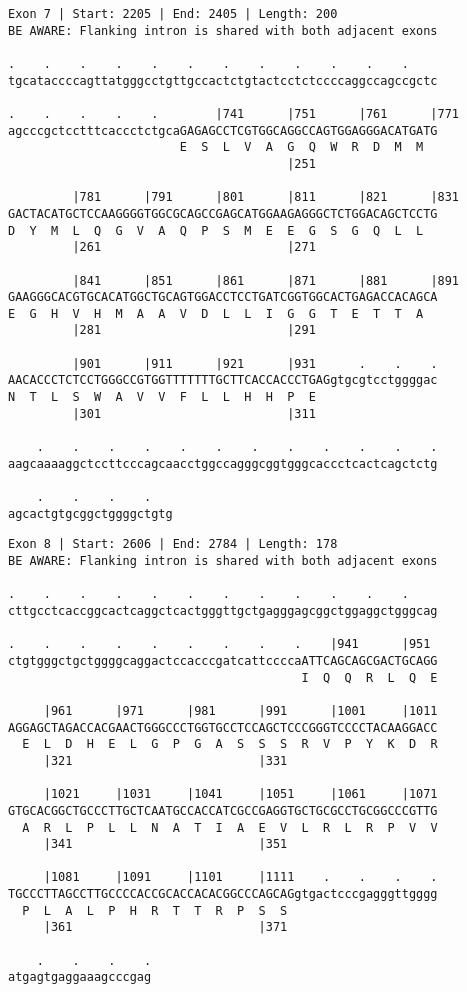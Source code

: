 \documentclass{article}
\begin{document}
\begin{Verbatim}
Exon 7 | Start: 2205 | End: 2405 | Length: 200
BE AWARE: Flanking intron is shared with both adjacent exons
 
.    .    .    .    .    .    .    .    .    .    .    .    
tgcataccccagttatgggcctgttgccactctgtactcctctccccaggccagccgctc
  
.    .    .    .    .        |741      |751      |761      |771
agcccgctcctttcaccctctgcaGAGAGCCTCGTGGCAGGCCAGTGGAGGGACATGATG
                        E  S  L  V  A  G  Q  W  R  D  M  M  
                                       |251                 
  
         |781      |791      |801      |811      |821      |831
GACTACATGCTCCAAGGGGTGGCGCAGCCGAGCATGGAAGAGGGCTCTGGACAGCTCCTG
D  Y  M  L  Q  G  V  A  Q  P  S  M  E  E  G  S  G  Q  L  L  
         |261                          |271                 
  
         |841      |851      |861      |871      |881      |891
GAAGGGCACGTGCACATGGCTGCAGTGGACCTCCTGATCGGTGGCACTGAGACCACAGCA
E  G  H  V  H  M  A  A  V  D  L  L  I  G  G  T  E  T  T  A  
         |281                          |291                 
  
         |901      |911      |921      |931      .    .    .
AACACCCTCTCCTGGGCCGTGGTTTTTTTGCTTCACCACCCTGAGgtgcgtcctggggac
N  T  L  S  W  A  V  V  F  L  L  H  H  P  E                 
         |301                          |311                 
  
    .    .    .    .    .    .    .    .    .    .    .    .
aagcaaaaggctccttcccagcaacctggccagggcggtgggcaccctcactcagctctg
  
    .    .    .    .   
agcactgtgcggctggggctgtg
\end{Verbatim}
\newpage
\begin{Verbatim}
Exon 8 | Start: 2606 | End: 2784 | Length: 178
BE AWARE: Flanking intron is shared with both adjacent exons
 
.    .    .    .    .    .    .    .    .    .    .    .    
cttgcctcaccggcactcaggctcactgggttgctgagggagcggctggaggctgggcag
  
.    .    .    .    .    .    .    .    .    |941      |951 
ctgtgggctgctggggcaggactccacccgatcattccccaATTCAGCAGCGACTGCAGG
                                         I  Q  Q  R  L  Q  E
  
     |961      |971      |981      |991      |1001     |1011
AGGAGCTAGACCACGAACTGGGCCCTGGTGCCTCCAGCTCCCGGGTCCCCTACAAGGACC
  E  L  D  H  E  L  G  P  G  A  S  S  S  R  V  P  Y  K  D  R
     |321                          |331                     
  
     |1021     |1031     |1041     |1051     |1061     |1071
GTGCACGGCTGCCCTTGCTCAATGCCACCATCGCCGAGGTGCTGCGCCTGCGGCCCGTTG
  A  R  L  P  L  L  N  A  T  I  A  E  V  L  R  L  R  P  V  V
     |341                          |351                     
  
     |1081     |1091     |1101     |1111    .    .    .    .
TGCCCTTAGCCTTGCCCCACCGCACCACACGGCCCAGCAGgtgactcccgagggttgggg
  P  L  A  L  P  H  R  T  T  R  P  S  S                     
     |361                          |371                     
  
    .    .    .    .
atgagtgaggaaagcccgag
\end{Verbatim}
\end{document}
